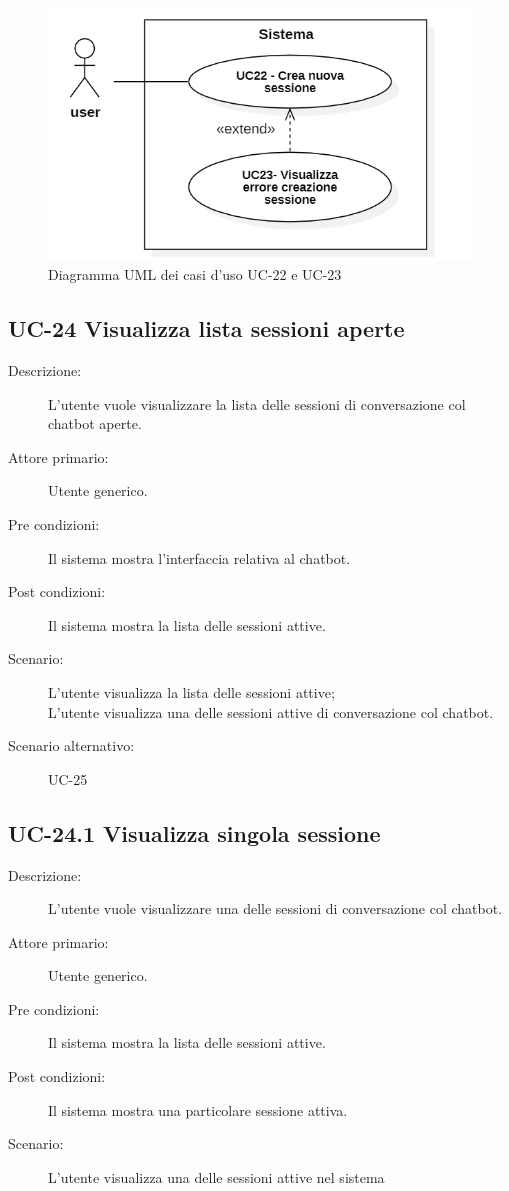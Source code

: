 \begin{figure}[H]
    \centering
    \includegraphics[width=0.8\linewidth]{UC22-23.PNG}
    \caption{Diagramma UML dei casi d'uso UC-22 e UC-23}
    \label{fig:UC22-23}
\end{figure}

\subsection{UC-24 Visualizza lista sessioni aperte}
\begin{description}
    \item[Descrizione:] L'utente vuole visualizzare la lista delle sessioni di conversazione col chatbot aperte.
    \item[Attore primario:] Utente generico.
    \item[Pre condizioni:] Il sistema mostra l'interfaccia relativa al chatbot.
    \item[Post condizioni:] Il sistema mostra la lista delle sessioni attive.
    \item[Scenario:] L'utente visualizza la lista delle sessioni attive;\\L'utente visualizza una delle sessioni attive di conversazione col chatbot.
    \item[Scenario alternativo:] UC-25
\end{description}

\subsection{UC-24.1 Visualizza singola sessione}
\begin{description}
    \item[Descrizione:] L'utente vuole visualizzare una delle sessioni di conversazione col chatbot.
    \item[Attore primario:] Utente generico.
    \item[Pre condizioni:] Il sistema mostra la lista delle sessioni attive.
        \item[Post condizioni:] Il sistema mostra una particolare sessione attiva.
    \item[Scenario:] L'utente visualizza una delle sessioni attive nel sistema
\end{description}

